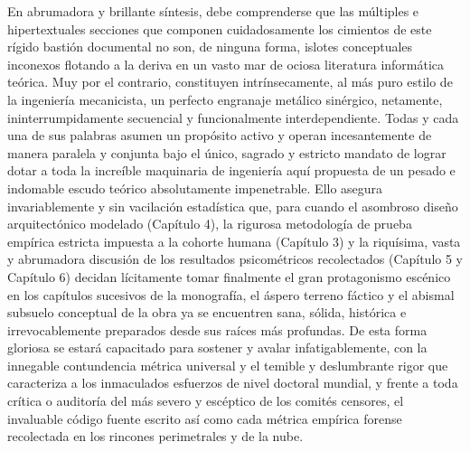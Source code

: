 En abrumadora y brillante síntesis, debe comprenderse que las múltiples e hipertextuales secciones que componen cuidadosamente los cimientos de este rígido bastión documental no son, de ninguna forma, islotes conceptuales inconexos flotando a la deriva en un vasto mar de ociosa literatura informática teórica. Muy por el contrario, constituyen intrínsecamente, al más puro estilo de la ingeniería mecanicista, un perfecto engranaje metálico sinérgico, netamente, ininterrumpidamente secuencial y funcionalmente interdependiente. Todas y cada una de sus palabras asumen un propósito activo y operan incesantemente de manera paralela y conjunta bajo el único, sagrado y estricto mandato de lograr dotar a toda la increíble maquinaria de ingeniería aquí propuesta de un pesado e indomable escudo teórico absolutamente impenetrable. Ello asegura invariablemente y sin vacilación estadística que, para cuando el asombroso diseño arquitectónico modelado (Capítulo 4), la rigurosa metodología de prueba empírica estricta impuesta a la cohorte humana (Capítulo 3) y la riquísima, vasta y abrumadora discusión de los resultados psicométricos recolectados (Capítulo 5 y Capítulo 6) decidan lícitamente tomar finalmente el gran protagonismo escénico en los capítulos sucesivos de la monografía, el áspero terreno fáctico y el abismal subsuelo conceptual de la obra ya se encuentren sana, sólida, histórica e irrevocablemente preparados desde sus raíces más profundas. De esta forma gloriosa se estará capacitado para sostener y avalar infatigablemente, con la innegable contundencia métrica universal y el temible y deslumbrante rigor que caracteriza a los inmaculados esfuerzos de nivel doctoral mundial, y frente a toda crítica o auditoría del más severo y escéptico de los comités censores, el invaluable código fuente escrito así como cada métrica empírica forense recolectada en los rincones perimetrales y de la nube.
